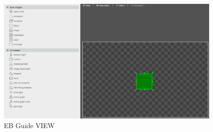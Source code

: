 \begin{figure}[!h]
\begin{center}
  \includegraphics[scale=0.4]{figures/Guide_View.PNG}
  \caption{EB Guide VIEW}
  \label{fig:Guide_View}
\end{center}
\end{figure}


